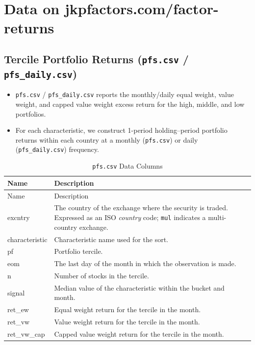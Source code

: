 \documentclass[12pt,title,fleqn]{article}
\begin{document}
\section{Data on jkpfactors.com/factor-returns}
\subsection{Tercile Portfolio Returns (\texttt{pfs.csv} / \texttt{pfs\_daily.csv})}

\begin{itemize}
  \item \texttt{pfs.csv} / \texttt{pfs\_daily.csv} reports the monthly/daily equal weight, value weight, and capped value weight excess return for the high, middle, and low portfolios.
  
  \item For each characteristic, we construct 1-period holding–period portfolio returns within each country at a monthly (\texttt{pfs.csv}) or daily (\texttt{pfs\_daily.csv}) frequency.

\end{itemize}
{\scriptsize
	\begin{longtable}{@{\extracolsep{\fill}}|l|m{14.2cm}|@{}}
	\caption{\texttt{pfs.csv} Data Columns \label{pfs}}\\
	
	\hline
	Name & Description \\
	\hline
	\endfirsthead
	
	\hline
	Name & Description \\
	\hline
	\endhead
	
	\hline
	\endfoot
	
	
	\hline\hline
	\endlastfoot
	
	excntry\rule{0pt}{10pt} & The country of the exchange where the security is traded. Expressed as an ISO \emph{country} code; \texttt{mul} indicates a multi\hyp country exchange. \\[1ex]
	
	characteristic & Characteristic name used for the sort. \\[1ex]
	
	pf & Portfolio tercile. \\[1ex]
	
	eom & The last day of the month in which the observation is made. \\[1ex]

	n & Number of stocks in the tercile. \\[1ex]
    
	signal & Median value of the characteristic within the bucket and month. \\[1ex]

	ret\_ew & Equal weight return for the tercile in the month.\\[1ex]

	ret\_vw & Value weight return for the tercile in the month.\\[1ex]

	ret\_vw\_cap & Capped value weight return for the tercile in the month.\\[1ex]

\end{longtable}}
\end{document}
